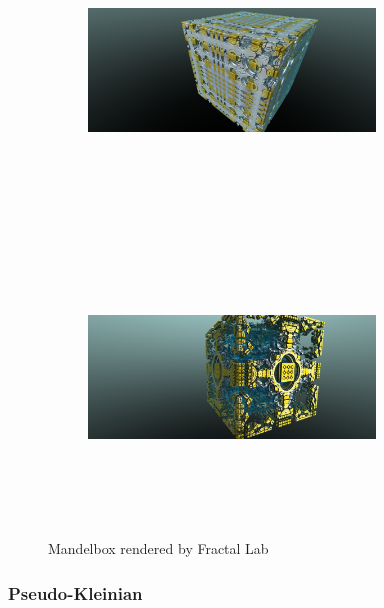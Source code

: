 \begin{figure}[h!tbp]
 \begin{subfigure}{0.49\hsize}
   \begin{center}
    \includegraphics[width=3in, height=3in, keepaspectratio]{../img/fractal/mandelbox.pdf}
    \caption{}
    \label{fig:mandelbox1}
   \end{center}
 \end{subfigure}
 \hspace*{\fill}
 \begin{subfigure}{0.49\hsize}
   \begin{center}
    \includegraphics[width=3in, height=3in, keepaspectratio]{../img/fractal/mandelbox2.pdf}
    \caption{}
    \label{fig:mandelbox2}
   \end{center}
 \end{subfigure}
 \caption{Mandelbox rendered by Fractal Lab}
 \label{fig:mandelbox}
\end{figure}


\subsubsection{Pseudo-Kleinian}


